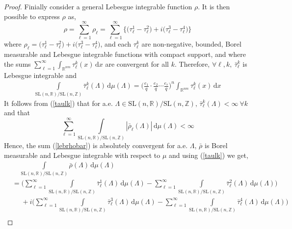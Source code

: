 \documentclass[11pt]{article}
\theoremstyle{definition}
\theoremstyle{proof}
\begin{document}
\begin{proof}
    Finially consider a general Lebesgue integrable function $\rho$.
    It is then possible to express $\rho$ as,
    \[
        \rho = \sum_{\ell = 1}^{\infty} \rho _\ell = \sum_{\ell=1}^{\infty} \big\{\big({\tau }_{\ell}^{1} - {\tau }_{\ell}^{2}\big) + i \big({\tau }_{\ell}^{3} - {\tau }_{\ell}^{4}\big)\big\}
    \]
    where $\rho _\ell = \big({\tau }_{\ell}^{1} - {\tau }_{\ell}^{2}\big) + i \big({\tau }_{\ell}^{3} - {\tau }_{\ell}^{4}\big)$, and each ${\tau }_{\ell}^{k}$ are non-negative, bounded, Borel measurable and Lebesgue integrable functions with compact support, and where the sums $\sum\limits_{\ell=1}^{\infty} \displaystyle\int_{\mathbb{R}^{nm}}{\tau }_{\ell}^{k}(x) \, \mathrm{d} x$ are convergent for all $k$.
    Therefore, $\forall \ell, k, \ {\bar{\tau }}_{\ell}^{k}$ is Lebesgue integrable and
    \begin{align}\label{taulk}
        \int\limits_{\mathrm{SL}(n,\mathbb{R})/\mathrm{SL}(n,\mathbb{Z})}{\bar{\tau }}_{\ell}^{k} (\Lambda ) \, \mathrm{d} \mu (\Lambda ) = {\bigg(\frac{e_1}{q} \cdot \frac{e_2}{q} \cdots \frac{e_r}{q} \bigg)}^n \int_{\mathbb{R}^{nm}} {\tau }_{\ell}^{k}(x) \, \mathrm{d} x
    \end{align}
    It follows from (\ref{taulk}) that for a.e. $\Lambda \in \mathrm{SL}(n,\mathbb{R})/\mathrm{SL}(n,\mathbb{Z}), \, {\bar{\tau }}_{\ell}^{k}(\Lambda ) < \infty \ \forall k$ and that
    \[
        \displaystyle\sum\limits_{\ell = 1}^{\infty} \int\limits_{\mathrm{SL}(n,\mathbb{R})/\mathrm{SL}(n,\mathbb{Z})} | \bar{\rho }_\ell (\Lambda )| \, \mathrm{d} \mu (\Lambda ) < \infty
    \]
    Hence, the sum (\ref{lebrhobar}) is absolutely convergent for a.e. $\Lambda$, $\bar{\rho }$ is Borel measurable and Lebesgue integrable with respect to $\mu$ and using (\ref{taulk}) we get,
    \begin{align*}\label{halfrogersend}
        & \ \ \ \ \ \int\limits_{\mathrm{SL}(n,\mathbb{R})/\mathrm{SL}(n,\mathbb{Z})} \bar{\rho }(\Lambda ) \, \mathrm{d} \mu (\Lambda ) \\
        &= \Bigg(\sum_{\ell=1}^{\infty} \int\limits_{\mathrm{SL}(n,\mathbb{R})/\mathrm{SL}(n,\mathbb{Z})}{\bar{\tau }}_{\ell}^{1}(\Lambda ) \, \mathrm{d} \mu (\Lambda ) - \sum_{\ell=1}^{\infty}\int\limits_{\mathrm{SL}(n,\mathbb{R})/\mathrm{SL}(n,\mathbb{Z})} {\bar{\tau }}_{\ell}^{2} (\Lambda ) \, \mathrm{d} \mu (\Lambda ) \Bigg) \\
        & \ \ \ \ \ \ + i \Bigg(\sum_{\ell=1}^{\infty} \int\limits_{\mathrm{SL}(n,\mathbb{R})/\mathrm{SL}(n,\mathbb{Z})}{\bar{\tau }}_{\ell}^{3}(\Lambda ) \, \mathrm{d} \mu (\Lambda ) - \sum_{\ell=1}^{\infty}\int\limits_{\mathrm{SL}(n,\mathbb{R})/\mathrm{SL}(n,\mathbb{Z})} {\bar{\tau }}_{\ell}^{4} (\Lambda ) \, \mathrm{d} \mu (\Lambda ) \Bigg) \\

\end{align*}
\end{proof}
\end{document}
